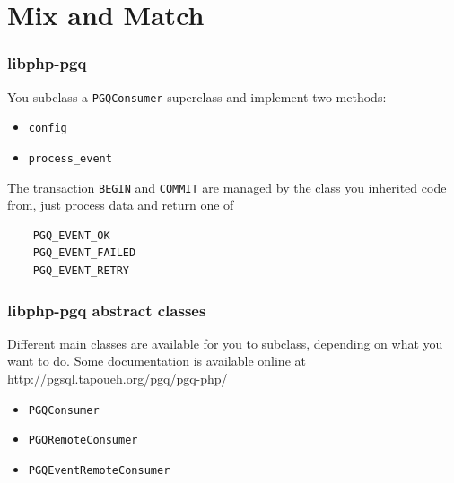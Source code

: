 \documentclass{beamer}
\begin{document}
\section{Mix and Match}


\begin{frame}[fragile]
  \frametitle{libphp-pgq}

  You subclass a \texttt{PGQConsumer} superclass and implement two methods:
  \begin{itemize}
   \item \texttt{config}
   \item \texttt{process\_event}
  \end{itemize}

  \pause

  The transaction \texttt{BEGIN} and \texttt{COMMIT} are managed by the
  class you inherited code from, just process data and return one of

  \begin{verbatim}
    PGQ_EVENT_OK
    PGQ_EVENT_FAILED
    PGQ_EVENT_RETRY
  \end{verbatim}
\end{frame}

\begin{frame}[fragile]
  \frametitle{libphp-pgq abstract classes}

  Different main classes are available for you to subclass, depending on
  what you want to do. Some documentation is available online at
  http://pgsql.tapoueh.org/pgq/pgq-php/

  \begin{itemize}
   \item<2-> \texttt{PGQConsumer}
   \item<3-> \texttt{PGQRemoteConsumer}
   \item<4-> \texttt{PGQEventRemoteConsumer}
  \end{itemize}
  

\end{frame}
\end{document}
